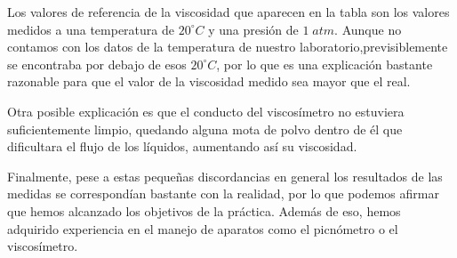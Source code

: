 \documentclass[a4paper,12pt,titlepage]{article}
\begin{document}
Los valores de referencia de la viscosidad que aparecen en la tabla son los valores medidos a una temperatura de $20^{\circ}C$ y una presión de $ 1 \;atm$. Aunque no contamos con los datos de la temperatura de nuestro laboratorio,previsiblemente se encontraba por debajo de esos $20^{\circ}C$, por lo que es una explicación bastante razonable para que el valor de la viscosidad medido sea mayor que el real. 

\par Otra posible explicación es que el conducto del viscosímetro no estuviera suficientemente limpio, quedando alguna mota de polvo dentro de él que dificultara el flujo de los líquidos, aumentando así su viscosidad.

\par Finalmente, pese a estas pequeñas discordancias en general los resultados de las medidas se correspondían bastante con la realidad, por lo que podemos afirmar que hemos alcanzado los objetivos de la práctica. Además de eso, hemos adquirido experiencia en el manejo de aparatos como el picnómetro o el viscosímetro.
\end{document}
